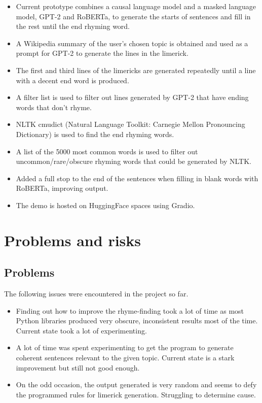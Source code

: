 \documentclass[11pt]{article}
\begin{document}
\begin{itemize}
    \tightlist
\item Current prototype combines a causal language model and a masked language model, GPT-2 and RoBERTa, to generate the starts of sentences and fill in the rest until the end rhyming word.
\item A Wikipedia summary of the user’s chosen topic is obtained and used as a prompt for GPT-2 to generate the lines in the limerick.
\item  The first and third lines of the limericks are generated repeatedly until a line with a decent end word is produced.
\item  A filter list is used to filter out lines generated by GPT-2 that have ending words that don’t rhyme.
\item  NLTK cmudict (Natural Language Toolkit: Carnegie Mellon Pronouncing Dictionary) is used to find the end rhyming words.
\item  A list of the 5000 most common words is used to filter out uncommon/rare/obscure rhyming words that could be generated by NLTK.
\item  Added a full stop to the end of the sentences when filling in blank words with RoBERTa, improving output.
\item The demo is hosted on HuggingFace spaces using Gradio.
\end{itemize}

\section{Problems and risks}\label{problems-and-risks}

\subsection{Problems}\label{problems}

The following issues were encountered in the project so far.
\begin{itemize}
    \tightlist
\item Finding out how to improve the rhyme-finding took a lot of time as most Python libraries produced very obscure, inconsistent results most of the time. Current state took a lot of experimenting.
\item A lot of time was spent experimenting to get the program to generate coherent sentences relevant to the given topic. Current state is a stark improvement but still not good enough.
\item On the odd occasion, the output generated is very random and seems to defy the programmed rules for limerick generation. Struggling to determine cause.
\end{itemize}
\end{document}
